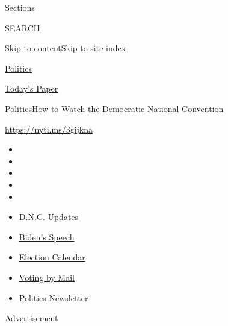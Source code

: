 Sections

SEARCH

\protect\hyperlink{site-content}{Skip to
content}\protect\hyperlink{site-index}{Skip to site index}

\href{https://www.nytimes3xbfgragh.onion/section/politics}{Politics}

\href{https://myaccount.nytimes3xbfgragh.onion/auth/login?response_type=cookie\&client_id=vi}{}

\href{https://www.nytimes3xbfgragh.onion/section/todayspaper}{Today's
Paper}

\href{/section/politics}{Politics}\textbar{}How to Watch the Democratic
National Convention

\url{https://nyti.ms/3gijkna}

\begin{itemize}
\item
\item
\item
\item
\item
\end{itemize}

\begin{itemize}
\item
  \href{https://www.nytimes3xbfgragh.onion/live/2020/08/21/us/dnc-convention-election?action=click\&pgtype=Article\&state=default\&region=TOP_BANNER\&context=storylines_menu}{D.N.C.
  Updates}
\item
  \href{https://www.nytimes3xbfgragh.onion/2020/08/20/us/politics/biden-presidential-nomination-dnc.html?action=click\&pgtype=Article\&state=default\&region=TOP_BANNER\&context=storylines_menu}{Biden's
  Speech}
\item
  \href{https://www.nytimes3xbfgragh.onion/interactive/2019/us/elections/2020-presidential-election-calendar.html?action=click\&pgtype=Article\&state=default\&region=TOP_BANNER\&context=storylines_menu}{Election
  Calendar}
\item
  \href{https://www.nytimes3xbfgragh.onion/interactive/2020/08/11/us/politics/vote-by-mail-us-states.html?action=click\&pgtype=Article\&state=default\&region=TOP_BANNER\&context=storylines_menu}{Voting
  by Mail}
\item
  \href{https://www.nytimes3xbfgragh.onion/newsletters/politics?action=click\&pgtype=Article\&state=default\&region=TOP_BANNER\&context=storylines_menu}{Politics
  Newsletter}
\end{itemize}

Advertisement

